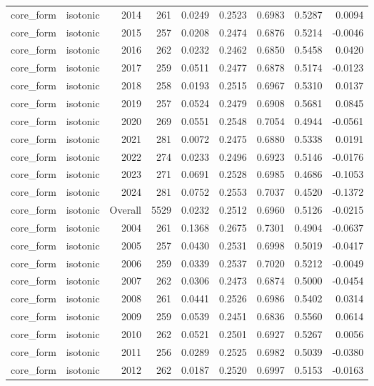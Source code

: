 \begin{table}[t]
\begin{tabular}{@{} l l r r r r r r r @{} }
      core\_form & isotonic & 2014 & 261 & 0.0249 & 0.2523 & 0.6983 & 0.5287 & 0.0094 \\
      core\_form & isotonic & 2015 & 257 & 0.0208 & 0.2474 & 0.6876 & 0.5214 & -0.0046 \\
      core\_form & isotonic & 2016 & 262 & 0.0232 & 0.2462 & 0.6850 & 0.5458 & 0.0420 \\
      core\_form & isotonic & 2017 & 259 & 0.0511 & 0.2477 & 0.6878 & 0.5174 & -0.0123 \\
      core\_form & isotonic & 2018 & 258 & 0.0193 & 0.2515 & 0.6967 & 0.5310 & 0.0137 \\
      core\_form & isotonic & 2019 & 257 & 0.0524 & 0.2479 & 0.6908 & 0.5681 & 0.0845 \\
      core\_form & isotonic & 2020 & 269 & 0.0551 & 0.2548 & 0.7054 & 0.4944 & -0.0561 \\
      core\_form & isotonic & 2021 & 281 & 0.0072 & 0.2475 & 0.6880 & 0.5338 & 0.0191 \\
      core\_form & isotonic & 2022 & 274 & 0.0233 & 0.2496 & 0.6923 & 0.5146 & -0.0176 \\
      core\_form & isotonic & 2023 & 271 & 0.0691 & 0.2528 & 0.6985 & 0.4686 & -0.1053 \\
      core\_form & isotonic & 2024 & 281 & 0.0752 & 0.2553 & 0.7037 & 0.4520 & -0.1372 \\
      core\_form & isotonic & Overall & 5529 & 0.0232 & 0.2512 & 0.6960 & 0.5126 & -0.0215 \\
      core\_form & isotonic & 2004 & 261 & 0.1368 & 0.2675 & 0.7301 & 0.4904 & -0.0637 \\
      core\_form & isotonic & 2005 & 257 & 0.0430 & 0.2531 & 0.6998 & 0.5019 & -0.0417 \\
      core\_form & isotonic & 2006 & 259 & 0.0339 & 0.2537 & 0.7020 & 0.5212 & -0.0049 \\
      core\_form & isotonic & 2007 & 262 & 0.0306 & 0.2473 & 0.6874 & 0.5000 & -0.0454 \\
      core\_form & isotonic & 2008 & 261 & 0.0441 & 0.2526 & 0.6986 & 0.5402 & 0.0314 \\
      core\_form & isotonic & 2009 & 259 & 0.0539 & 0.2451 & 0.6836 & 0.5560 & 0.0614 \\
      core\_form & isotonic & 2010 & 262 & 0.0521 & 0.2501 & 0.6927 & 0.5267 & 0.0056 \\
      core\_form & isotonic & 2011 & 256 & 0.0289 & 0.2525 & 0.6982 & 0.5039 & -0.0380 \\
      core\_form & isotonic & 2012 & 262 & 0.0187 & 0.2520 & 0.6997 & 0.5153 & -0.0163 \\

\end{tabular}
\end{table}
